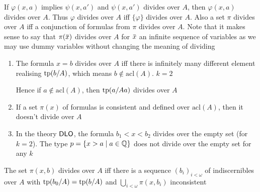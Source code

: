 \documentclass[11pt]{article}
\def \acl {\text{acl}}
\begin{document}

If \(\varphi(x,a)\) implies \(\psi(x,a')\) and \(\psi(x,a')\) divides over \(A\), then \(\varphi(x,a)\) divides
over \(A\). Thus \(\varphi\) divides over \(A\) iff \(\{\varphi\}\) divides over \(A\). Also a set \(\pi\) divides
over \(A\) iff a conjunction of formulas from \(\pi\) divides over \(A\). Note that it makes sense to
say that \(\pi(\barx)\) divides over \(A\) for \(\barx\) an infinite sequence of variables as we
may use dummy variables without changing the meaning of dividing



\begin{examplle}[]
\begin{enumerate}
\item The formula \(x=b\) divides over \(A\) iff there is infinitely many different element
realising \(\operatorname{tp}(b/A)\), which means \(b\notin\acl(A)\). \(k=2\)

Hence if \(a\notin\acl(A)\), then \(\operatorname{tp}(a/Aa)\) divides over \(A\)
\item If a set \(\pi(x)\) of formulas is consistent and defined over \(\acl(A)\), then it doesn't
divide over \(A\)
\item In the theory \(\operatorname{\textsf{DLO}}\), the formula \(b_1<x<b_2\) divides over the empty set (for \(k=2\)). The
type \(p=\{x>a\mid a\in\mathbb{Q}\}\) does not divide over the empty set for any \(k\)
\end{enumerate}
\end{examplle}


\begin{lemma}[]
\label{lemma7.1.4}
The set \(\pi(x,b)\) divides over \(A\) iff there is a sequence \((b_i)_{i<\omega}\) of indiscernibles
over \(A\) with \(\operatorname{tp}(b_0/A)=\operatorname{tp}(b/A)\) and \(\bigcup_{i<\omega}\pi(x,b_i)\) inconsistent
\end{lemma}
\end{document}
